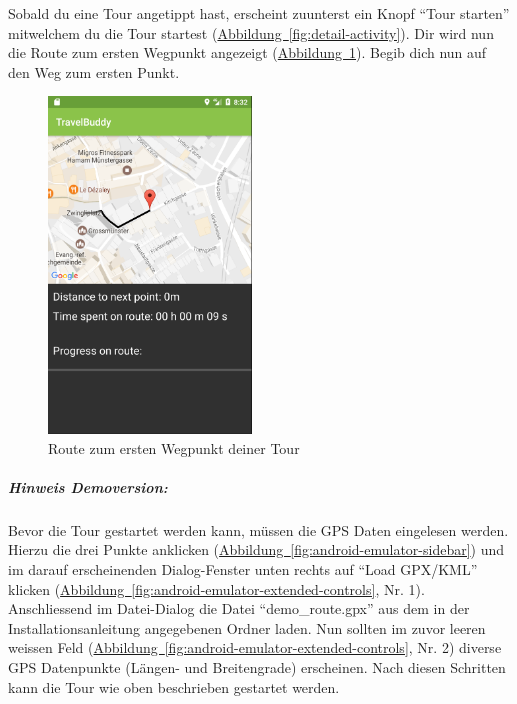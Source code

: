 \documentclass[a4paper,10pt,xetex]{article}
\begin{document}
Sobald du eine Tour angetippt hast, erscheint zuunterst ein Knopf ``Tour starten''
mitwelchem du die Tour startest (\hyperref[fig:detail-activity]{Abbildung~\ref*{fig:detail-activity}}).
Dir wird nun die Route zum ersten Wegpunkt angezeigt (\hyperref[fig:tour-activity]{Abbildung~\ref*{fig:tour-activity}}).
Begib dich nun auf den Weg zum ersten Punkt.

\begin{figure}
  \centering
  \includegraphics[width=0.48\textwidth]{screenshots/TourActivityStart}
  \caption{Route zum ersten Wegpunkt deiner Tour}
  \label{fig:tour-activity}
\end{figure}

\subparagraph{Hinweis Demoversion:}
Bevor die Tour gestartet werden kann, müssen die GPS Daten eingelesen werden. Hierzu
die drei Punkte anklicken (\hyperref[fig:android-emulator-sidebar]{Abbildung~\ref*{fig:android-emulator-sidebar}})
und im darauf erscheinenden Dialog-Fenster unten rechts auf ``Load GPX/KML'' klicken
(\hyperref[fig:android-emulator-extended-controls]{Abbildung~\ref*{fig:android-emulator-extended-controls}}, Nr. 1).
Anschliessend im Datei-Dialog die Datei ``demo\_route.gpx'' aus dem in der
Installationsanleitung angegebenen Ordner laden. Nun sollten im zuvor leeren
weissen Feld (\hyperref[fig:android-emulator-extended-controls]{Abbildung~\ref*{fig:android-emulator-extended-controls}}, Nr. 2)
diverse GPS Datenpunkte (Längen- und Breitengrade) erscheinen. Nach diesen
Schritten kann die Tour wie oben beschrieben gestartet werden.
\end{document}

